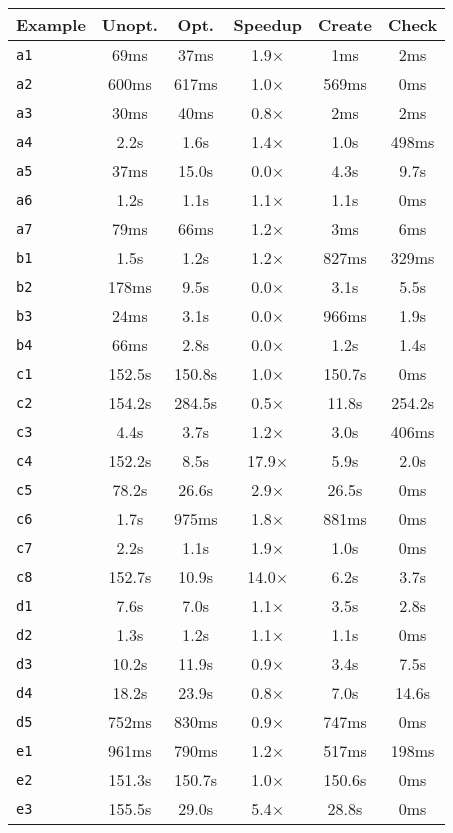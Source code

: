 \begin{tabular}{lccccc}
\toprule
Example & Unopt. & Opt. & Speedup & Create & Check \\
\midrule
\texttt{a1} & 69ms & 37ms & 1.9× & 1ms & 2ms \\
\texttt{a2} & 600ms & 617ms & 1.0× & 569ms & 0ms \\
\texttt{a3} & 30ms & 40ms & 0.8× & 2ms & 2ms \\
\texttt{a4} & 2.2s & 1.6s & 1.4× & 1.0s & 498ms \\
\texttt{a5} & 37ms & 15.0s & 0.0× & 4.3s & 9.7s \\
\texttt{a6} & 1.2s & 1.1s & 1.1× & 1.1s & 0ms \\
\texttt{a7} & 79ms & 66ms & 1.2× & 3ms & 6ms \\
\texttt{b1} & 1.5s & 1.2s & 1.2× & 827ms & 329ms \\
\texttt{b2} & 178ms & 9.5s & 0.0× & 3.1s & 5.5s \\
\texttt{b3} & 24ms & 3.1s & 0.0× & 966ms & 1.9s \\
\texttt{b4} & 66ms & 2.8s & 0.0× & 1.2s & 1.4s \\
\texttt{c1} & 152.5s & 150.8s & 1.0× & 150.7s & 0ms \\
\texttt{c2} & 154.2s & 284.5s & 0.5× & 11.8s & 254.2s \\
\texttt{c3} & 4.4s & 3.7s & 1.2× & 3.0s & 406ms \\
\texttt{c4} & 152.2s & 8.5s & 17.9× & 5.9s & 2.0s \\
\texttt{c5} & 78.2s & 26.6s & 2.9× & 26.5s & 0ms \\
\texttt{c6} & 1.7s & 975ms & 1.8× & 881ms & 0ms \\
\texttt{c7} & 2.2s & 1.1s & 1.9× & 1.0s & 0ms \\
\texttt{c8} & 152.7s & 10.9s & 14.0× & 6.2s & 3.7s \\
\texttt{d1} & 7.6s & 7.0s & 1.1× & 3.5s & 2.8s \\
\texttt{d2} & 1.3s & 1.2s & 1.1× & 1.1s & 0ms \\
\texttt{d3} & 10.2s & 11.9s & 0.9× & 3.4s & 7.5s \\
\texttt{d4} & 18.2s & 23.9s & 0.8× & 7.0s & 14.6s \\
\texttt{d5} & 752ms & 830ms & 0.9× & 747ms & 0ms \\
\texttt{e1} & 961ms & 790ms & 1.2× & 517ms & 198ms \\
\texttt{e2} & 151.3s & 150.7s & 1.0× & 150.6s & 0ms \\
\texttt{e3} & 155.5s & 29.0s & 5.4× & 28.8s & 0ms \\

\end{tabular}
